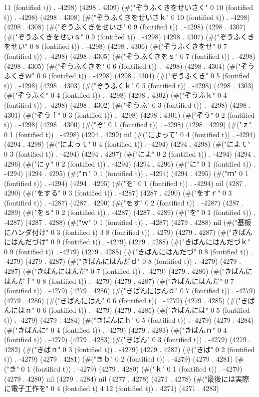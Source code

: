 11 (fontified t)) . -4298) (4298 . 4309) (#("ぞうふくきをせいさく" 0 10 (fontified t)) . -4298) (4298 . 4308) (#("ぞうふくきをせいさｋ" 0 10 (fontified t)) . -4298) (4298 . 4308) (#("ぞうふくきをせいさ" 0 9 (fontified t)) . -4298) (4298 . 4307) (#("ぞうふくきをせいｓ" 0 9 (fontified t)) . -4298) (4298 . 4307) (#("ぞうふくきをせい" 0 8 (fontified t)) . -4298) (4298 . 4306) (#("ぞうふくきをせ" 0 7 (fontified t)) . -4298) (4298 . 4305) (#("ぞうふくきをｓ" 0 7 (fontified t)) . -4298) (4298 . 4305) (#("ぞうふくきを" 0 6 (fontified t)) . -4298) (4298 . 4304) (#("ぞうふくきｗ" 0 6 (fontified t)) . -4298) (4298 . 4304) (#("ぞうふくき" 0 5 (fontified t)) . -4298) (4298 . 4303) (#("ぞうふくｋ" 0 5 (fontified t)) . -4298) (4298 . 4303) (#("ぞうふく" 0 4 (fontified t)) . -4298) (4298 . 4302) (#("ぞうふｋ" 0 4 (fontified t)) . -4298) (4298 . 4302) (#("ぞうふ" 0 3 (fontified t)) . -4298) (4298 . 4301) (#("ぞうｆ" 0 3 (fontified t)) . -4298) (4298 . 4301) (#("ぞう" 0 2 (fontified t)) . -4298) (4298 . 4300) (#("ぞ" 0 1 (fontified t)) . -4298) (4298 . 4299) (#("ｚ" 0 1 (fontified t)) . -4298) (4294 . 4299) nil (#("によって" 0 4 (fontified t)) . -4294) (4294 . 4298) (#("によっｔ" 0 4 (fontified t)) . -4294) (4294 . 4298) (#("によｔ" 0 3 (fontified t)) . -4294) (4294 . 4297) (#("によ" 0 2 (fontified t)) . -4294) (4294 . 4296) (#("にｙ" 0 2 (fontified t)) . -4294) (4294 . 4296) (#("に" 0 1 (fontified t)) . -4294) (4294 . 4295) (#("ｎ" 0 1 (fontified t)) . -4294) (4294 . 4295) (#("ｍ" 0 1 (fontified t)) . -4294) (4294 . 4295) (#("を" 0 1 (fontified t)) . -4294) nil (4287 . 4290) (#("をする" 0 3 (fontified t)) . -4287) (4287 . 4290) (#("をすｒ" 0 3 (fontified t)) . -4287) (4287 . 4290) (#("をす" 0 2 (fontified t)) . -4287) (4287 . 4289) (#("をｓ" 0 2 (fontified t)) . -4287) (4287 . 4289) (#("を" 0 1 (fontified t)) . -4287) (4287 . 4288) (#("ｗ" 0 1 (fontified t)) . -4287) (4279 . 4288) nil (#("基板にハンダ付け" 0 3 (fontified t) 3 8 (fontified t)) . 4279) (4279 . 4287) (#("きばんにはんだづけ" 0 9 (fontified t)) . -4279) (4279 . 4288) (#("きばんにはんだづｋ" 0 9 (fontified t)) . -4279) (4279 . 4288) (#("きばんにはんだづ" 0 8 (fontified t)) . -4279) (4279 . 4287) (#("きばんにはんだｄ" 0 8 (fontified t)) . -4279) (4279 . 4287) (#("きばんにはんだ" 0 7 (fontified t)) . -4279) (4279 . 4286) (#("きばんにはんだｆ" 0 8 (fontified t)) . -4279) (4279 . 4287) (#("きばんにはんだ" 0 7 (fontified t)) . -4279) (4279 . 4286) (#("きばんにはんｄ" 0 7 (fontified t)) . -4279) (4279 . 4286) (#("きばんにはん" 0 6 (fontified t)) . -4279) (4279 . 4285) (#("きばんにはｎ" 0 6 (fontified t)) . -4279) (4279 . 4285) (#("きばんには" 0 5 (fontified t)) . -4279) (4279 . 4284) (#("きばんにｈ" 0 5 (fontified t)) . -4279) (4279 . 4284) (#("きばんに" 0 4 (fontified t)) . -4279) (4279 . 4283) (#("きばんｎ" 0 4 (fontified t)) . -4279) (4279 . 4283) (#("きばん" 0 3 (fontified t)) . -4279) (4279 . 4282) (#("きばｎ" 0 3 (fontified t)) . -4279) (4279 . 4282) (#("きば" 0 2 (fontified t)) . -4279) (4279 . 4281) (#("きｂ" 0 2 (fontified t)) . -4279) (4279 . 4281) (#("き" 0 1 (fontified t)) . -4279) (4279 . 4280) (#("ｋ" 0 1 (fontified t)) . -4279) (4279 . 4280) nil (4279 . 4284) nil (4277 . 4278) (4271 . 4278) (#("最後には実際に電子工作を" 0 4 (fontified t) 4 12 (fontified t)) . 4271) (4271 . 4283) 